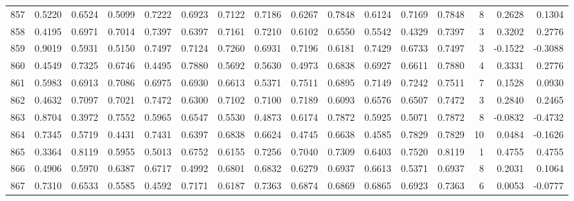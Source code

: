 \begin{tabular}{lrrrrrrrrrrrrrrr}
857 &      0.5220 &  0.6524 &  0.5099 &  0.7222 &  0.6923 &  0.7122 &  0.7186 &  0.6267 &  0.7848 &  0.6124 &   0.7169 &     0.7848 &      8 &                    0.2628 &                     0.1304 \\
858 &      0.4195 &  0.6971 &  0.7014 &  0.7397 &  0.6397 &  0.7161 &  0.7210 &  0.6102 &  0.6550 &  0.5542 &   0.4329 &     0.7397 &      3 &                    0.3202 &                     0.2776 \\
859 &      0.9019 &  0.5931 &  0.5150 &  0.7497 &  0.7124 &  0.7260 &  0.6931 &  0.7196 &  0.6181 &  0.7429 &   0.6733 &     0.7497 &      3 &                   -0.1522 &                    -0.3088 \\
860 &      0.4549 &  0.7325 &  0.6746 &  0.4495 &  0.7880 &  0.5692 &  0.5630 &  0.4973 &  0.6838 &  0.6927 &   0.6611 &     0.7880 &      4 &                    0.3331 &                     0.2776 \\
861 &      0.5983 &  0.6913 &  0.7086 &  0.6975 &  0.6930 &  0.6613 &  0.5371 &  0.7511 &  0.6895 &  0.7149 &   0.7242 &     0.7511 &      7 &                    0.1528 &                     0.0930 \\
862 &      0.4632 &  0.7097 &  0.7021 &  0.7472 &  0.6300 &  0.7102 &  0.7100 &  0.7189 &  0.6093 &  0.6576 &   0.6507 &     0.7472 &      3 &                    0.2840 &                     0.2465 \\
863 &      0.8704 &  0.3972 &  0.7552 &  0.5965 &  0.6547 &  0.5530 &  0.4873 &  0.6174 &  0.7872 &  0.5925 &   0.5071 &     0.7872 &      8 &                   -0.0832 &                    -0.4732 \\
864 &      0.7345 &  0.5719 &  0.4431 &  0.7431 &  0.6397 &  0.6838 &  0.6624 &  0.4745 &  0.6638 &  0.4585 &   0.7829 &     0.7829 &     10 &                    0.0484 &                    -0.1626 \\
865 &      0.3364 &  0.8119 &  0.5955 &  0.5013 &  0.6752 &  0.6155 &  0.7256 &  0.7040 &  0.7309 &  0.6403 &   0.7520 &     0.8119 &      1 &                    0.4755 &                     0.4755 \\
866 &      0.4906 &  0.5970 &  0.6387 &  0.6717 &  0.4992 &  0.6801 &  0.6832 &  0.6279 &  0.6937 &  0.6613 &   0.5371 &     0.6937 &      8 &                    0.2031 &                     0.1064 \\
867 &      0.7310 &  0.6533 &  0.5585 &  0.4592 &  0.7171 &  0.6187 &  0.7363 &  0.6874 &  0.6869 &  0.6865 &   0.6923 &     0.7363 &      6 &                    0.0053 &                    -0.0777 \\

\end{tabular}
